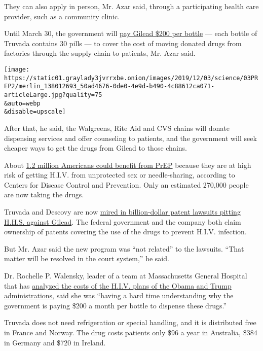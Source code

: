They can also apply in person, Mr. Azar said, through a participating
health care provider, such as a community clinic.

Until March 30, the government will
\href{https://news.bloomberglaw.com/health-law-and-business/gilead-wins-6-million-deal-to-distribute-hiv-drug-it-donated}{pay
Gilead \$200 per bottle} --- each bottle of Truvada contains 30 pills
--- to cover the cost of moving donated drugs from factories through the
supply chain to patients, Mr. Azar said.

\texttt{[image: https://static01.graylady3jvrrxbe.onion/images/2019/12/03/science/03PREP2/merlin\_138012693\_50ad4676-0de0-4e9d-b490-4c88612ca071-articleLarge.jpg?quality=75\\\&auto=webp\\\&disable=upscale]}

After that, he said, the Walgreens, Rite Aid and CVS chains will donate
dispensing services and offer counseling to patients, and the government
will seek cheaper ways to get the drugs from Gilead to those chains.

About
\href{https://www.cdc.gov/nchhstp/newsroom/2019/ending-HIV-transmission-press-release.html}{1.2
million Americans could benefit from PrEP} because they are at high risk
of getting H.I.V. from unprotected sex or needle-sharing, according to
Centers for Disease Control and Prevention. Only an estimated 270,000
people are now taking the drugs.

Truvada and Descovy are now
\href{https://www.nytimes3xbfgragh.onion/2019/11/08/health/hiv-prevention-truvada-patents.html}{mired
in billion-dollar patent lawsuits pitting H.H.S. against Gilead}. The
federal government and the company both claim ownership of patents
covering the use of the drugs to prevent H.I.V. infection.

But Mr. Azar said the new program was ``not related'' to the lawsuits.
``That matter will be resolved in the court system,'' he said.

Dr. Rochelle P. Walensky, leader of a team at Massachusetts General
Hospital that has
\href{https://www.nytimes3xbfgragh.onion/2019/03/12/health/trump-hiv-aids-costs.html}{analyzed
the costs of the H.I.V. plans of the Obama and Trump administrations},
said she was ``having a hard time understanding why the government is
paying \$200 a month per bottle to dispense these drugs.''

Truvada does not need refrigeration or special handling, and it is
distributed free in France and Norway. The drug costs patients only \$96
a year in Australia, \$384 in Germany and \$720 in Ireland.

